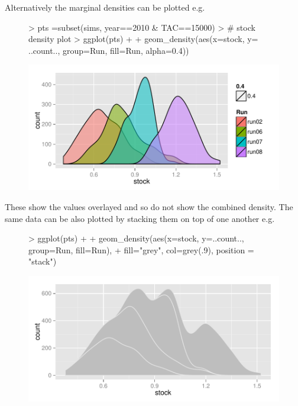\documentclass[shortnames,nojss,article]{jss}
\begin{document}
\clearpage
Alternatively the marginal densities can be plotted e.g.

\begin{figure}\begin{center}
\begin{Schunk}
\begin{Sinput}
> pts =subset(sims, year==2010 & TAC==15000)
> # stock density plot
> ggplot(pts) + 
+   geom_density(aes(x=stock, y= ..count.., group=Run, fill=Run, alpha=0.4))
\end{Sinput}
\end{Schunk}
\includegraphics{kobe-021}
\end{center}\end{figure}

These show the values overlayed and so do not show the combined density. The same data can be also plotted by stacking them on top
of one another e.g.

\begin{figure}\begin{center}
\begin{Schunk}
\begin{Sinput}
> ggplot(pts) + 
+   geom_density(aes(x=stock, y=..count.., group=Run, fill=Run), 
+                         fill="grey", col=grey(.9), position = "stack") 
\end{Sinput}
\end{Schunk}
\includegraphics{kobe-022}
\end{center}\end{figure}
\end{document}
